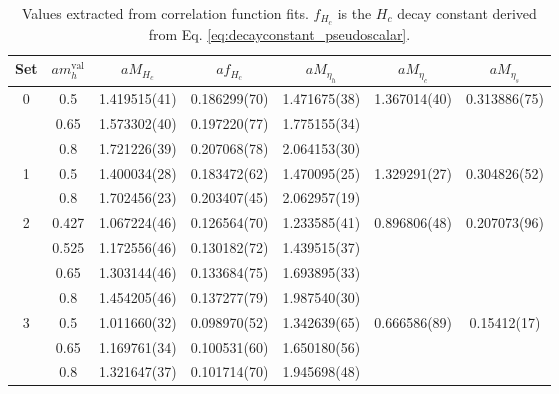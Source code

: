 \begin{table}
\begin{center}
\begin{tabular}{ c c c c c c c }
\hline
Set & $am_h^{\text{val}}$ & $aM_{H_c}$& $af_{H_c}$& $aM_{\eta_h}$& $aM_{\eta_c}$& $aM_{\eta_s}$\\ [0.5ex]
\hline
0 & 0.5 & 1.419515(41) & 0.186299(70) & 1.471675(38) & 1.367014(40) & 0.313886(75)\\ [0.5ex] 
 & 0.65 & 1.573302(40) & 0.197220(77) & 1.775155(34) & & \\ [0.5ex] 
 & 0.8 & 1.721226(39) & 0.207068(78) & 2.064153(30) & &\\ [0.5ex] 
\hline
1 & 0.5 & 1.400034(28) & 0.183472(62) & 1.470095(25) & 1.329291(27) & 0.304826(52)\\ [0.5ex] 
 & 0.8 & 1.702456(23) & 0.203407(45) & 2.062957(19) & & \\ [0.5ex] 
\hline
2 & 0.427 & 1.067224(46) & 0.126564(70) & 1.233585(41) & 0.896806(48) & 0.207073(96)\\ [0.5ex] 
 & 0.525 & 1.172556(46) & 0.130182(72) & 1.439515(37) & & \\ [0.5ex] 
 & 0.65 & 1.303144(46) & 0.133684(75) & 1.693895(33) & & \\ [0.5ex] 
 & 0.8 & 1.454205(46) & 0.137277(79) & 1.987540(30) & & \\ [0.5ex] 
\hline
3 & 0.5 & 1.011660(32) & 0.098970(52) & 1.342639(65) & 0.666586(89) & 0.15412(17)\\ [0.5ex] 
 & 0.65 & 1.169761(34) & 0.100531(60) & 1.650180(56) & & \\ [0.5ex] 
 & 0.8 & 1.321647(37) & 0.101714(70) & 1.945698(48) & & \\ [0.5ex] 
\hline
\end{tabular}
\caption{Values extracted from correlation function fits. $f_{H_c}$  is the $H_c$ decay constant derived from Eq. \eqref{eq:decayconstant_pseudoscalar}. \label{tab:results2_BsDsstar} }
\end{center}
\end{table}


